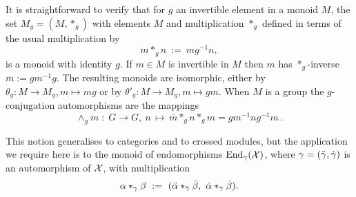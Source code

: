 \medskip 
It is straightforward to verify that for $g$ an invertible element 
in a monoid $M$, the set $M_g = (M,\ast_g)$ with elements $M$ and 
multiplication $\ast_g$ defined in terms of the usual multiplication by
\begin{equation} \label{eq:star-g-defn} 
m \ast_g n ~:=~ mg^{-1}n, 
\end{equation} 
is a monoid with identity $g$. 
If $m \in M$ is invertible in $M$ then $m$ has $\ast_g$-inverse 
$\overline{m} := gm^{-1}g$. 
The resulting monoids are isomorphic, 
either by $\theta_g : M \to M_g, m \mapsto mg$ 
or by $\theta'_g : M \to M_g, m \mapsto gm$.  
When $M$ is a group the $g$-conjugation automorphisms are the mappings 
\begin{equation} \label{eq:g-conj} 
\wedge_g m \;:\; G \to G,~ 
    n \,\mapsto\, \overline{m} \ast_g n \ast_g m = gm^{-1}ng^{-1}m\,. 
\end{equation} 

This notion generalises to categories and to crossed modules, 
but the application we require here is to the monoid of endomorphisms 
$\mathrm{End}_{\gamma}(\mathcal{X})$, 
where $\gamma = (\ddot{\gamma},\dot{\gamma})$ is an automorphism of $\mathcal{X}$, 
with multiplication 
\begin{equation} \label{eq:star-gamma-calX} 
\alpha\ast_{\gamma}\beta ~:=~ 
(\ddot{\alpha}\ast_{\ddot{\gamma}}\ddot{\beta},~ \dot{\alpha}\ast_{\dot{\gamma}}\dot{\beta}). 
\end{equation} 

